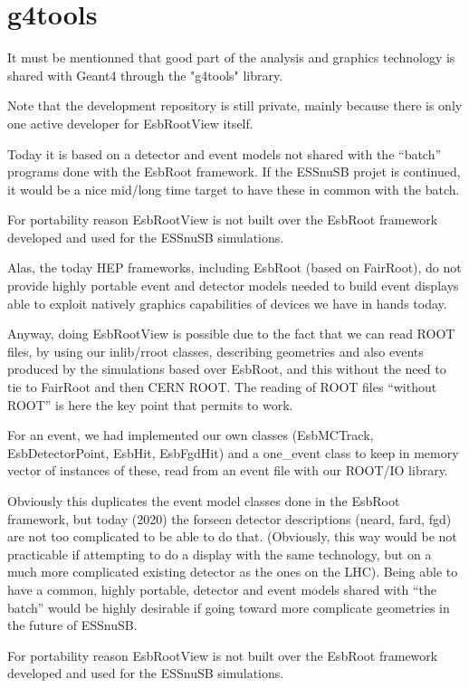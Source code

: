 \section{g4tools}
It must be mentionned that good part of the analysis and graphics
technology is shared with Geant4 through the "g4tools" library.


Note that the development repository is still private, mainly because
there is only one active developer for EsbRootView itself.

Today it is based on a detector and event models not shared with the
``batch'' programs done with the EsbRoot framework. If the ESSnuSB projet is continued, it would be a nice
mid/long time target to have these in common with the
batch.

For portability reason EsbRootView is not built over the
EsbRoot framework developed and used for the ESSnuSB simulations.

Alas, the today HEP frameworks, including EsbRoot (based on FairRoot), do not provide
highly portable event and detector models needed to build
event displays able to exploit natively graphics capabilities of
devices we have in hands today.

Anyway, doing EsbRootView is possible due to the fact that we can read ROOT
files, by using our inlib/rroot classes, describing geometries and also events produced by the
simulations based over EsbRoot, and this without the need to tie to
FairRoot and then CERN ROOT. The reading of ROOT files ``without ROOT'' is here the key point that
permits to work.


For an event, we had implemented our own classes (EsbMCTrack,
EsbDetectorPoint, EsbHit, EsbFgdHit) and a one\_event class to keep in
memory vector of instances of these, read from an event file with our
ROOT/IO library.


Obviously
this duplicates the event model classes done in the EsbRoot framework,
but today (2020) the forseen detector descriptions (neard, fard, fgd) are not too
complicated to be able to do that. (Obviously, this way would be not
practicable
if attempting to do a display with the same technology, but on a much
more
complicated existing detector as the ones on the LHC). Being able to
have a common, highly portable, detector and event models shared with
``the batch'' would be highly desirable if going toward more
complicate geometries in the future of ESSnuSB.

For portability reason EsbRootView is not built over the
EsbRoot framework developed and used for the ESSnuSB simulations.

